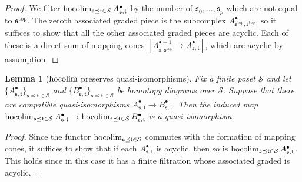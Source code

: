 \documentclass[12pt]{article}
\newtheorem{lemma}[theorem]{Lemma}
\theoremstyle{definition}
\theoremstyle{remark}
\numberwithin{equation}{subsection}
\newcommand{\SSS}{\mathcal S}
\newcommand{\ttop}{\mathrm{top}}
\newcommand{\hocolim}{\operatornamewithlimits{hocolim}}
\begin{document}
\begin{proof}
We filter $\hocolim_{\mathfrak s\preceq\mathfrak t\in\SSS}A^\bullet_{\mathfrak s,\mathfrak t}$ by the number of $\mathfrak s_0,\ldots,\mathfrak s_p$ which are not equal to $\mathfrak s^\ttop$.  The zeroth associated graded piece is the subcomplex $A^\bullet_{\mathfrak s^\ttop,\mathfrak s^\ttop}$, so it suffices to show that all the other associated graded pieces are acyclic.  Each of these is a direct sum of mapping cones $[A^{\bullet+1}_{\mathfrak s,\mathfrak s^\ttop}\to A^\bullet_{\mathfrak s,\mathfrak t}]$, which are acyclic by assumption.
\end{proof}

\begin{lemma}[$\hocolim$ preserves quasi-isomorphisms]\label{simplicialchainsquasiisomorphism}
Fix a finite poset $\SSS$ and let $\{A^\bullet_{\mathfrak s,\mathfrak t}\}_{\mathfrak s\preceq\mathfrak t\in\SSS}$ and $\{B^\bullet_{\mathfrak s,\mathfrak t}\}_{\mathfrak s\preceq\mathfrak t\in\SSS}$ be homotopy diagrams over $\SSS$.  Suppose that there are compatible quasi-isomorphisms $A^\bullet_{\mathfrak s,\mathfrak t}\to B^\bullet_{\mathfrak s,\mathfrak t}$.  Then the induced map $\hocolim_{\mathfrak s\preceq\mathfrak t\in\SSS}A^\bullet_{\mathfrak s,\mathfrak t}\to\hocolim_{\mathfrak s\preceq\mathfrak t\in\SSS}B^\bullet_{\mathfrak s,\mathfrak t}$ is a quasi-isomorphism.
\end{lemma}

\begin{proof}
Since the functor $\hocolim_{\mathfrak s\preceq\mathfrak t\in\SSS}$ commutes with the formation of mapping cones, it suffices to show that if each $A^\bullet_{\mathfrak s,\mathfrak t}$ is acyclic, then so is $\hocolim_{\mathfrak s\preceq\mathfrak t\in\SSS}A^\bullet_{\mathfrak s,\mathfrak t}$.  This holds since in this case it has a finite filtration whose associated graded is acyclic.
\end{proof}
\end{document}
